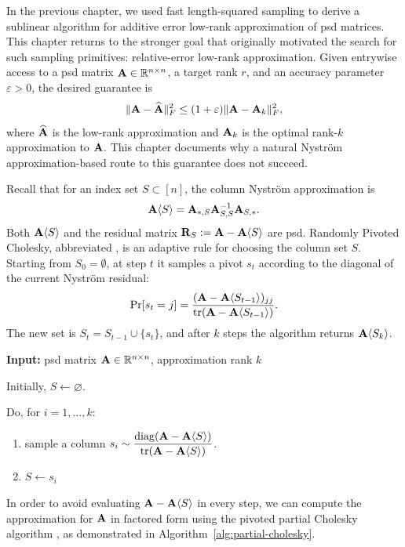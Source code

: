 

In the previous chapter, we used fast length-squared sampling to derive a sublinear algorithm for additive error low-rank approximation of psd matrices. This chapter returns to the stronger goal that originally motivated the search for such sampling primitives: relative-error low-rank approximation. Given entrywise access to a psd matrix $\mathbf{A}\in\mathbb{R}^{n\times n}$, a target rank $r$, and an accuracy parameter $\varepsilon>0$, the desired guarantee is
\[
    \|\mathbf{A}-\widehat{\mathbf{A}}\|_F^2
    \leq
    (1+\varepsilon)\|\mathbf{A}-\mathbf{A}_k\|_F^2,
\]
where $\widehat{\mathbf{A}}$ is the low-rank approximation and $\mathbf{A}_k$ is the optimal rank-$k$ approximation to $\mathbf{A}$. This chapter documents why a natural Nystr\"om approximation-based route to this guarantee does not succeed.

Recall that for an index set $S\subset[n]$, the column Nystr\"om approximation is
\[
    \mathbf{A}\langle S\rangle
    =
    \mathbf{A}_{*,S}\mathbf{A}_{S,S}^{-1}\mathbf{A}_{S,*}.
\]
Both $\mathbf{A}\langle S\rangle$ and the residual matrix $\mathbf{R}_S:=\mathbf{A}-\mathbf{A}\langle S\rangle$ are psd. Randomly Pivoted Cholesky, abbreviated \RPCholesky, is an adaptive rule for choosing the column set $S$. Starting from $S_0=\emptyset$, at step $t$ it samples a pivot $s_t$ according to the diagonal of the current Nystr\"om residual:
\[
    \Pr[s_t=j]
    =
    \frac{(\mathbf{A}-\mathbf{A}\langle S_{t-1}\rangle)_{jj}}
         {\tr(\mathbf{A}-\mathbf{A}\langle S_{t-1}\rangle)}.
\]
The new set is $S_t=S_{t-1}\cup\{s_t\}$, and after $k$ steps the algorithm returns $\mathbf{A}\langle S_k\rangle$. 

\begin{algorithm}[H]
    \label{alg:rpc-adapt}
    \caption{Randomly Pivoted Cholesky}
    \textbf{Input:} {psd matrix $\mathbf{A}\in\mathbb{R}^{n\times n}$, approximation rank $k$}
    
    \smallskip
    Initially, $S\gets \varnothing$.
    
    \smallskip
    Do, for  {$i = 1, \ldots, k$}:
    \begin{enumerate}[
    label=\arabic*.,
    leftmargin=2em,
    itemsep=0.35em,
    topsep=0.45em,
    parsep=0pt
]
        \item sample a column $\displaystyle s_i \sim \frac{\operatorname*{diag}(\mathbf{A} - \mathbf{A}\langle S\rangle)}{\tr(\mathbf{A} - \mathbf{A}\langle S\rangle)}$.
        \item $S\gets s_i$
    \end{enumerate}
\end{algorithm}

In order to avoid evaluating $\mathbf{A} - \mathbf{A}\langle S\rangle$ in every step, we can compute the approximation for $\mathbf{A}$ in factored form using the pivoted partial Cholesky algorithm \cite{chen_randomly_2025}, as demonstrated in Algorithm~\ref{alg:partial-cholesky}.

